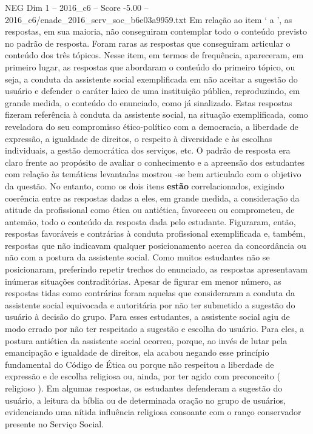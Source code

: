 \begin{textsample}{NEG Dim 1 – 2016\_c6 – Score -5.00 – 2016\_c6/enade\_2016\_serv\_soc\_b6e03a9959.txt}
Em relação ao item ‘ a ’, as respostas, em sua maioria, não conseguiram contemplar todo o conteúdo previsto no padrão de resposta.
Foram raras as respostas que conseguiram articular o conteúdo dos três tópicos.
Nesse item, em termos de frequência, apareceram, em primeiro lugar, as respostas que abordaram o conteúdo do primeiro tópico, ou seja, a conduta da assistente social exemplificada em não aceitar a sugestão do usuário e defender o caráter laico de uma instituição pública, reproduzindo, em grande medida, o conteúdo do enunciado, como já sinalizado.
Estas respostas fizeram referência à conduta da assistente social, na situação exemplificada, como reveladora do seu compromisso ético-político com a democracia, a liberdade de expressão, a igualdade de direitos, o respeito à diversidade e às escolhas individuais, a gestão democrática dos serviços, etc.
O padrão de resposta era claro frente ao propósito de avaliar o conhecimento e a apreensão dos estudantes com relação às temáticas levantadas mostrou -se bem articulado com o objetivo da questão.
No entanto, como os dois itens \textbf{estão} correlacionados, exigindo coerência entre as respostas dadas a eles, em grande medida, a consideração da atitude da profissional como ética ou antiética, favoreceu ou comprometeu, de antemão, todo o conteúdo da resposta dada pelo estudante.
Figuraram, então, respostas favoráveis e contrárias à conduta profissional exemplificada e, também, respostas que não indicavam qualquer posicionamento acerca da concordância ou não com a postura da assistente social.
Como muitos estudantes não se posicionaram, preferindo repetir trechos do enunciado, as respostas apresentavam inúmeras situações contraditórias.
Apesar de figurar em menor número, as respostas tidas como contrárias foram aquelas que consideraram a conduta da assistente social equivocada e autoritária por não ter submetido a sugestão do usuário à decisão do grupo.
Para esses estudantes, a assistente social agiu de modo errado por não ter respeitado a sugestão e escolha do usuário.
Para eles, a postura antiética da assistente social ocorreu, porque, ao invés de lutar pela emancipação e igualdade de direitos, ela acabou negando esse princípio fundamental do Código de Ética ou porque não respeitou a liberdade de expressão e de escolha religiosa ou, ainda, por ter agido com preconceito ( religioso ).
Em algumas respostas, os estudantes defenderam a sugestão do usuário, a leitura da bíblia ou de determinada oração no grupo de usuários, evidenciando uma nítida influência religiosa consoante com o ranço conservador presente no Serviço Social.

\end{textsample}
